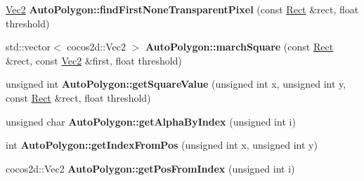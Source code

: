 \begin{DoxyCompactItemize}
\hyperlink{classVec2}{Vec2} {\bfseries Auto\+Polygon\+::find\+First\+None\+Transparent\+Pixel} (const \hyperlink{classRect}{Rect} \&rect, float threshold)
\item 
\mbox{\label{group____2d_ga1b18663f50f5023083fd9f6e9add52f0}} 
std\+::vector$<$ cocos2d\+::\+Vec2 $>$ {\bfseries Auto\+Polygon\+::march\+Square} (const \hyperlink{classRect}{Rect} \&rect, const \hyperlink{classVec2}{Vec2} \&first, float threshold)
\item 
\mbox{\label{group____2d_ga223fe50d22790b0230d0df81e1b40d54}} 
unsigned int {\bfseries Auto\+Polygon\+::get\+Square\+Value} (unsigned int x, unsigned int y, const \hyperlink{classRect}{Rect} \&rect, float threshold)
\item 
\mbox{\label{group____2d_ga472c0c55c8d49dfa6cb96845c4a80c8e}} 
unsigned char {\bfseries Auto\+Polygon\+::get\+Alpha\+By\+Index} (unsigned int i)
\item 
\mbox{\label{group____2d_gaf3673a169615beec0c9d645987452803}} 
int {\bfseries Auto\+Polygon\+::get\+Index\+From\+Pos} (unsigned int x, unsigned int y)
\item 
\mbox{\label{group____2d_ga30343a9dbbf33738aad895e5b9469944}} 
cocos2d\+::\+Vec2 {\bfseries Auto\+Polygon\+::get\+Pos\+From\+Index} (unsigned int i)
\end{DoxyCompactItemize}
